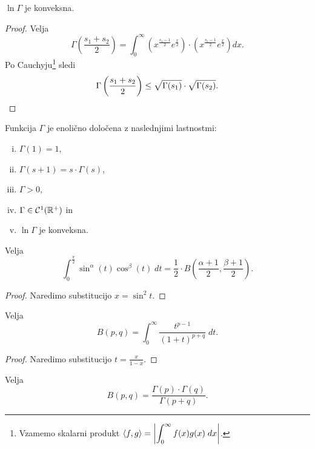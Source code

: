 \begin{posledica}
$\ln\Gamma$ je konveksna.
\end{posledica}

\begin{proof}
Velja
\[
\Gamma\left(\frac{s_1 + s_2}{2}\right) =
\int_0^\infty \left(x^{\frac{s_1-1}{2}} e^{\frac{x}{2}}\right)
\cdot \left(x^{\frac{s_1-1}{2}} e^{\frac{x}{2}}\right)dx.
\]
Po Cauchyju\footnote{Vzamemo skalarni produkt
$\displaystyle\left\langle f,g\right\rangle = \left\lvert \int_0^\infty f(x)g(x)\;dx\right\rvert$.}
sledi
\[
\Gamma\left(\frac{s_1 + s_2}{2}\right) \leq
\sqrt{\Gamma(s_1)} \cdot \sqrt{\Gamma(s_2)}. \qedhere
\]
\end{proof}

\begin{opomba}
Funkcija $\Gamma$ je enolično določena z naslednjimi lastnostmi:

\begin{enumerate}[i)]
\item $\Gamma(1) = 1$,
\item $\Gamma(s+1) = s \cdot \Gamma(s)$,
\item $\Gamma > 0$,
\item $\Gamma \in \mathcal{C}^1(\mathbb{R}^+)$ in
\item $\ln\Gamma$ je konveksna.
\end{enumerate}
\end{opomba}

\begin{trditev}
Velja
\[
\int_0^{\frac{\pi}{2}} \sin^\alpha(t) \cos^\beta(t)\;dt =
\frac{1}{2} \cdot
B\left(\frac{\alpha+1}{2}, \frac{\beta+1}{2}\right).
\]
\end{trditev}

\begin{proof}
Naredimo substitucijo $x = \sin^2 t$.
\end{proof}

\begin{trditev}
Velja
\[
B(p,q) = \int_0^\infty \frac{t^{p-1}}{(1+t)^{p+q}}\;dt.
\]
\end{trditev}

\begin{proof}
Naredimo substitucijo $t = \frac{x}{1-x}$.
\end{proof}

\begin{izrek}
Velja
\[
B(p,q) = \frac{\Gamma(p) \cdot \Gamma(q)}{\Gamma(p+q)}.
\]
\end{izrek}


